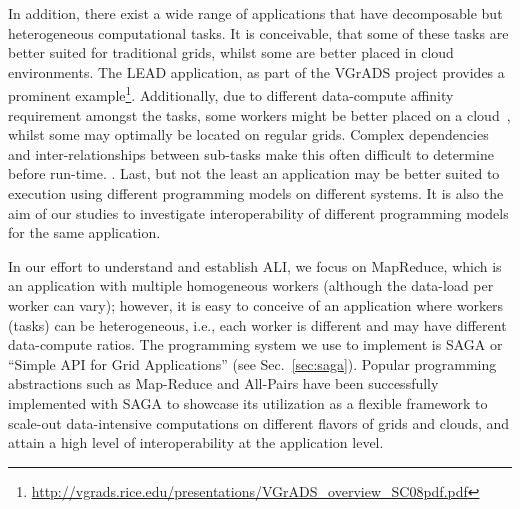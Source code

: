 \documentclass[3p,twocolumn]{elsarticle}
\begin{document}
In addition, there exist a wide range of applications that have
decomposable but heterogeneous computational tasks. It is conceivable,
that some of these tasks are better suited for traditional grids,
whilst some are better placed in cloud environments.  The LEAD
application, as part of the VGrADS project provides a prominent
example\footnote{\url{http://vgrads.rice.edu/presentations/VGrADS_overview_SC08pdf.pdf}}.
Additionally, due to different data-compute affinity requirement
amongst the tasks, some workers might be better placed on a
cloud~\cite{jha_ccpe09}, whilst some may optimally be located on
regular grids. Complex dependencies and inter-relationships between
sub-tasks make this often difficult to determine before run-time.
.  Last, but not
the least an application may be better suited to execution using
different programming models on different systems.  It is also the aim
of our studies to investigate interoperability of different
programming models for the same application.



In our effort to understand and establish ALI, we focus on MapReduce,
which is an application with multiple homogeneous workers (although
the data-load per worker can vary); however, it is easy to conceive of
an application where workers (tasks) can be heterogeneous, i.e., each
worker is different and may have different data-compute ratios.  The
programming system we use to implement \mr is SAGA or “Simple API for
Grid Applications'' (see Sec.~\ref{sec:saga}).  Popular programming
abstractions such as Map-Reduce and All-Pairs \cite{allpairs} have
been successfully implemented with SAGA to showcase its utilization as
a flexible framework to scale-out data-intensive computations on
different flavors of grids and clouds, and attain a high level of
interoperability at the application level.
\end{document}
